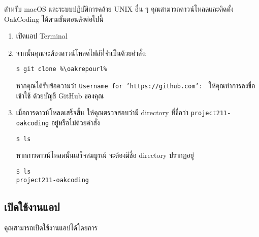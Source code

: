 \rule{0em}{1ex}

สำหรับ macOS และระบบปฏิบัติการคล้าย UNIX อื่น ๆ คุณสามารถดาวน์โหลด\linebreak[3] \mbox{และติดตั้ง} OakCoding ได้ตามขั้นตอนดังต่อไปนี้

\begin{enumerate}
\setlength{\itemsep}{0.7pt}
    \item เปิดแอป Terminal


    \item จากนั้นคุณจะต้องดาวน์โหลดไฟล์ทีี่จำเป็นด้วยคำสั่ง:

\begin{lstlisting}[numbers=none]
$ git clone %\oakrepourl%
\end{lstlisting}

    หากคุณได้รับข้อความว่า \texttt{Username for 'https://github.com': } ให้คุณทำการลงชื่อเข้าใช้
    ด้วยบัญชี GitHub ของคุณ

    \item เมื่อการดาวน์โหลดเสร็จสิ้น ให้คุณตรวจสอบว่ามี directory ที่ชื่อว่า \mbox{\texttt{project211-oakcoding}} อยู่หรือไม่ด้วยคำสั่ง

\begin{lstlisting}[numbers=none]
$ ls
\end{lstlisting}

    หากการดาวน์โหลดนั้นเสร็จสมบูรณ์ จะต้องมีชื่อ directory ปรากฏอยู่

\begin{lstlisting}[numbers=none]
$ ls
project211-oakcoding
\end{lstlisting}
\end{enumerate}

\clearpage

\subsection{เปิดใช้งานแอป}
\label{subsec:launch-app}

\rule{0em}{1ex}

คุณสามารถเปิดใช้งานแอปได้โดยการ

